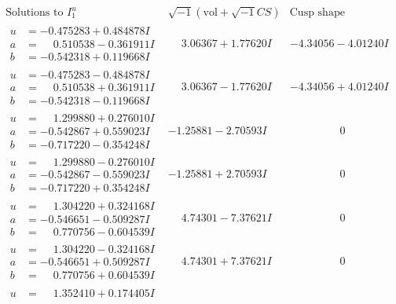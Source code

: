 \documentclass[1p]{elsarticle_modified}
\theoremstyle{definition}
\newcommand{\I}{\sqrt{-1}}
\begin{document}
$$\begin{array}{c|c|c}
\text{Solutions to }I^u_{1}& \I (\text{vol} + \sqrt{-1}CS) & \text{Cusp shape}\\
 \hline 
\begin{aligned}
u &= -0.475283 + 0.484878 I \\
a &= \phantom{-}0.510538 - 0.361911 I \\
b &= -0.542318 + 0.119668 I\end{aligned}
 & \phantom{-}3.06367 + 1.77620 I & -4.34056 - 4.01240 I \\ \hline\begin{aligned}
u &= -0.475283 - 0.484878 I \\
a &= \phantom{-}0.510538 + 0.361911 I \\
b &= -0.542318 - 0.119668 I\end{aligned}
 & \phantom{-}3.06367 - 1.77620 I & -4.34056 + 4.01240 I \\ \hline\begin{aligned}
u &= \phantom{-}1.299880 + 0.276010 I \\
a &= -0.542867 + 0.559023 I \\
b &= -0.717220 - 0.354248 I\end{aligned}
 & -1.25881 - 2.70593 I & \phantom{-0.000000 } 0 \\ \hline\begin{aligned}
u &= \phantom{-}1.299880 - 0.276010 I \\
a &= -0.542867 - 0.559023 I \\
b &= -0.717220 + 0.354248 I\end{aligned}
 & -1.25881 + 2.70593 I & \phantom{-0.000000 } 0 \\ \hline\begin{aligned}
u &= \phantom{-}1.304220 + 0.324168 I \\
a &= -0.546651 - 0.509287 I \\
b &= \phantom{-}0.770756 - 0.604539 I\end{aligned}
 & \phantom{-}4.74301 - 7.37621 I & \phantom{-0.000000 } 0 \\ \hline\begin{aligned}
u &= \phantom{-}1.304220 - 0.324168 I \\
a &= -0.546651 + 0.509287 I \\
b &= \phantom{-}0.770756 + 0.604539 I\end{aligned}
 & \phantom{-}4.74301 + 7.37621 I & \phantom{-0.000000 } 0 \\ \hline\begin{aligned}
u &= \phantom{-}1.352410 + 0.174405 I \\

\end{aligned}
\end{array}$$
\end{document}
